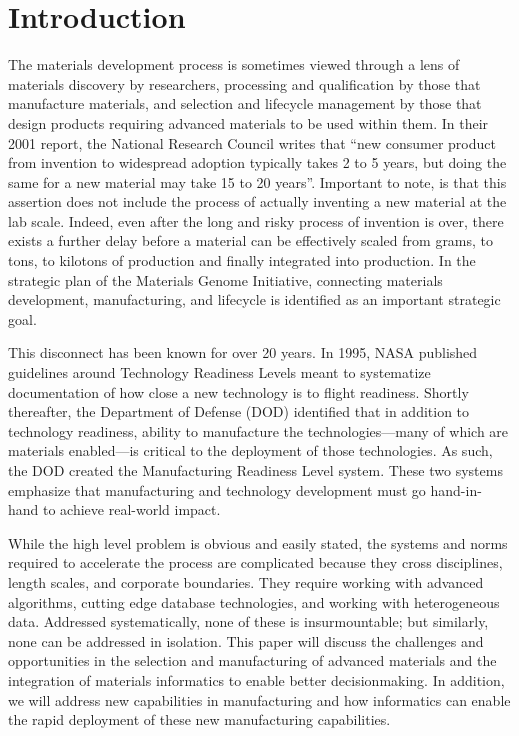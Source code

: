 \section{Introduction}
The materials development process is sometimes viewed through a lens of materials discovery by researchers, processing and qualification by those that manufacture materials, and selection and lifecycle management by those that design products requiring advanced materials to be used within them. In their 2001 report, the National Research Council writes that ``new consumer product from invention to widespread adoption typically takes 2 to 5 years, but doing the same for a new material may take 15 to 20 years''\cite{NAP10187}. Important to note, is that this assertion does not include the process of actually inventing a new material at the lab scale. Indeed, even after the long and risky process of invention is over, there exists a further delay before a material can be effectively scaled from grams, to tons, to kilotons of production and finally integrated into production. In the strategic plan of the Materials Genome Initiative, connecting materials development, manufacturing, and lifecycle is identified as an important strategic goal\cite{MGIPlan}. 

This disconnect has been known for over 20 years. In 1995, NASA published guidelines around Technology Readiness Levels meant to systematize documentation of how close a new technology is to flight readiness\cite{TRL}. Shortly thereafter, the Department of Defense (DOD) identified that in addition to technology readiness, ability to manufacture the technologies---many of which are materials enabled---is critical to the deployment of those technologies. As such, the DOD created the Manufacturing Readiness Level system\cite{MRL}. These two systems emphasize that manufacturing and technology development must go hand-in-hand to achieve real-world impact.

While the high level problem is obvious and easily stated, the systems and norms required to accelerate the process are complicated because they cross disciplines, length scales, and corporate boundaries. They require working with advanced algorithms, cutting edge database technologies, and working with heterogeneous data. Addressed systematically, none of these is insurmountable; but similarly, none can be addressed in isolation. This paper will discuss the challenges and opportunities in the selection and manufacturing of advanced materials and the integration of materials informatics to enable better decisionmaking. In addition, we will address new capabilities in manufacturing and how informatics can enable the rapid deployment of these new manufacturing capabilities.